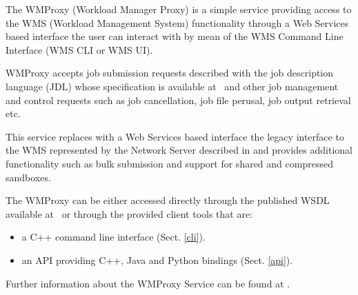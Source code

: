 
The WMProxy (Workload Manager Proxy) is a simple service providing access 
to the WMS (Workload Management System) functionality through a Web Services based 
interface the user can interact with by mean of the WMS Command Line Interface (WMS CLI or WMS UI).

WMProxy accepts job submission requests described with the job description language 
(JDL) whose specification is available at~\cite{JDL} and other job management and 
control requests such as job cancellation, job file perusal, job output retrieval etc.

This service replaces with a Web Services based interface the legacy interface to the WMS 
represented by the Network Server described in \cite{WMS} and provides additional 
functionality such as bulk submission and support for shared and compressed sandboxes. 

The WMProxy can be either accessed directly through the published WSDL available 
at~\cite{wmproxy-wsdl} or through the provided client tools that are:
\begin{itemize}
  \item a C++ command line interface (Sect. \ref{cli}).
  \item an API providing C++, Java and Python bindings (Sect. \ref{api}). 
\end{itemize}

Further information about the WMProxy Service can be found at \cite{wmproxy-wiki}. 

